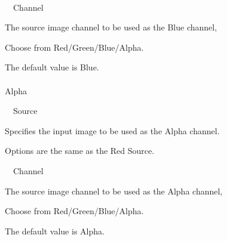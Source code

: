 \documentclass[a4paper,12pt]{article}
\begin{document}
\newpage

\thispagestyle{empty}

\ \vspace{-0.2em}
\par
\noindent \ \, Channel\par
The source image channel to be used as the Blue channel,\par
Choose from Red/Green/Blue/Alpha.\par
The default value is Blue.\\
\\
Alpha\par
\noindent \ \, Source\par
Specifies the input image to be used as the Alpha channel.\par
Options are the same as the \textquotedbl Red Source\textquotedbl .\\
\par
\noindent \ \, Channel\par
The source image channel to be used as the Alpha channel,\par
Choose from Red/Green/Blue/Alpha.\par
The default value is Alpha.
\end{document}
